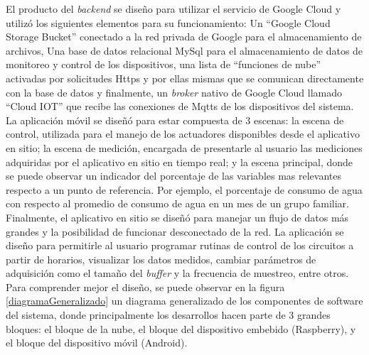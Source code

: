 El producto del \textit{backend} se diseño para utilizar el servicio de Google Cloud y utilizó los siguientes elementos para su funcionamiento: Un ``Google Cloud Storage Bucket'' conectado a la red privada de Google para el almacenamiento de archivos, Una base de datos relacional MySql para el almacenamiento de datos de monitoreo y control de los dispositivos, una lista de ``funciones de nube''  activadas por solicitudes Https y por ellas mismas que se comunican directamente con la base de datos y finalmente, un \textit{broker} nativo de Google Cloud llamado ``Cloud IOT'' que recibe las conexiones de Mqtts de los dispositivos del sistema.
\vspace{0.5cm}\\
La aplicación móvil se diseñó para estar compuesta de 3 escenas: la escena de control, utilizada para el manejo de los actuadores disponibles desde el aplicativo en sitio; la escena de medición, encargada de presentarle al usuario las mediciones adquiridas por el aplicativo en sitio en tiempo real; y la escena principal, donde se puede observar un indicador del porcentaje de las variables mas relevantes respecto a un punto de referencia. Por ejemplo, el porcentaje de consumo de agua con respecto al promedio de consumo de agua en un mes de un grupo familiar.
\vspace{0.5cm}\\
Finalmente, el aplicativo en sitio se diseñó para manejar un flujo de datos más grandes y la posibilidad de funcionar desconectado de la red. La aplicación se diseño para permitirle al usuario programar rutinas de control de los circuitos a partir de horarios, visualizar los datos medidos, cambiar parámetros de adquisición como el tamaño del \textit{buffer} y la frecuencia de muestreo, entre otros.
\vspace{0.5cm}\\
Para comprender mejor el diseño, se puede observar en la figura \ref{diagramaGeneralizado} un diagrama generalizado de los componentes de software del sistema, donde principalmente los desarrollos hacen parte de 3 grandes bloques: el bloque de la nube, el bloque del dispositivo embebido (Raspberry), y el bloque del dispositivo móvil (Android).
\vspace{0.5cm}\\
